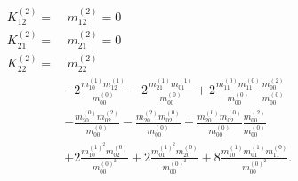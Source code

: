 \begin{align}
\begin{aligned}
    K_{12}^{(2)} =&\ m_{12}^{(2)} = 0\\
    K_{21}^{(2)} =&\ m_{21}^{(2)} = 0\\
    K_{22}^{(2)}
    = &\
    m_{22}^{(2)}
    \\&
    - 2 \frac{ m_{10}^{(1)} m_{12}^{(1)} }{m_{00}^{(0)}}
    - 2 \frac{ m_{21}^{(1)} m_{01}^{(1)} }{m_{00}^{(0)}}
    + 2 \frac{ m_{11}^{(0)} m_{11}^{(0)} }{m_{00}^{(0)}}\frac{ m_{00}^{(2)} }{m_{00}^{(0)}}
    \\&
    - \frac{ m_{20}^{(0)} m_{02}^{(2)} }{m_{00}^{(0)}}
    - \frac{ m_{20}^{(2)} m_{02}^{(0)} }{m_{00}^{(0)}}
    + \frac{ m_{20}^{(0)} m_{02}^{(0)} }{m_{00}^{(0)}}\frac{ m_{00}^{(2)} }{m_{00}^{(0)}}
    \\&
    + 2 \frac{ m_{10}^{{(1)}^2} m_{02}^{(0)} }{m_{00}^{{(0)}^2}}
    + 2 \frac{ m_{01}^{{(1)}^2} m_{20}^{(0)} }{m_{00}^{{(0)}^2}}
    + 8 \frac{ m_{10}^{(1)}m_{01}^{(1)} m_{11}^{(0)} }{m_{00}^{{(0)}^2}}.
  \end{aligned}
\end{align}
